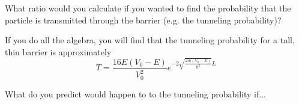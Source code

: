 \begin{questions}
		
		\question What ratio would you calculate if you wanted to find the probability that the particle is transmitted through the barrier (e.g. the tunneling probability)?
				
					\begin{solution}[1.5in]
					\end{solution}
		
		\question If you do all the algebra, you will find that the tunneling probability for a tall, thin barrier is approximately
			\begin{equation*}
				T = \frac{16E(V_0-E)}{V_0^2} e^{-2\sqrt{\frac{2m(V_0-E)}{\hbar^2}}L}
			\end{equation*}
			
			What do you predict would happen to to the tunneling probability if...
	\end{questions}	
	
